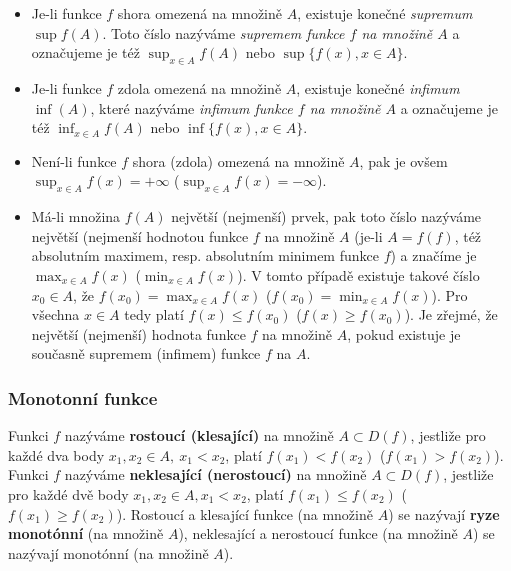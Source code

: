         \begin{itemize}\addtolength{\itemsep}{-0.5\baselineskip}
          \item Je-li funkce $f$ shora omezená na množině $A$, existuje konečné \emph{supremum}     
                $\sup f(A)$. Toto číslo nazýváme \emph{supremem funkce $f$ na množině $A$} a 
                označujeme je též $\sup_{x\in A}f(A)$ nebo $\sup\{f(x), x\in A\}$.
          \item Je-li funkce $f$ zdola omezená na množině $A$, existuje konečné \emph{infimum} 
                $\inf(A)$, které nazýváme \emph{infimum funkce $f$ na množině $A$} a označujeme je 
                též $\inf_{x\in A}f(A)$ nebo $\inf\{f(x), x\in A\}$. 
          \item Není-li funkce $f$ shora (zdola) omezená na množině $A$, pak je ovšem $\sup_{x\in A}
                f(x)=+\infty$ ($\sup_{x\in A} f(x)=-\infty$).
          \item Má-li množina $f(A)$ největší (nejmenší) prvek, pak toto číslo nazýváme největší 
                (nejmenší hodnotou funkce $f$  na množině $A$ (je-li $A = f(f)$, též absolutním 
                maximem, resp. absolutním minimem funkce $f$) a značíme je $\max_{x\in A} f(x)$ 
                ($\min_{x\in A} f(x)$). V tomto případě existuje takové číslo $x_0\in A$, že 
                $f(x_0)=\max_{x\in A}f(x)$ ($f(x_0)=\min_{x\in A}f(x)$). Pro všechna $x\in A$ tedy 
                platí $f(x)\leq f(x_0)$ ($f(x)\geq f(x_0)$). Je zřejmé, že největší (nejmenší) 
                hodnota funkce $f$ na množině $A$, pokud existuje je současně supremem (infimem) 
                funkce $f$ na $A$.
        \end{itemize}

        
       
      \subsubsection{Monotonní funkce}
        \begin{definition}\label{MA1:def_lim02}
          Funkci $f$ nazýváme \textbf{rostoucí (klesající)} na množině $A\subset D(f)$, jestliže 
          pro každé dva body $x_1, x_2\in A,\ x_1<x_2$, platí $f(x_1)<f(x_2)$ ($f(x_1)>f(x_2)$). 
          Funkci $f$ nazýváme \textbf{neklesající (nerostoucí)} na množině $A\subset D(f)$, 
          jestliže pro každé dvě body $x_1, x_2\in A,x_1<x_2$, platí $f(x_1)\leq f(x_2)$ 
          ($f(x_1)\geq f(x_2)$). Rostoucí a klesající funkce (na množině $A$) se nazývají 
          \textbf{ryze monotónní} (na množině $A$), neklesající a nerostoucí funkce (na množině 
          $A$) se nazývají monotónní (na množině $A$).    
        \end{definition}
            
